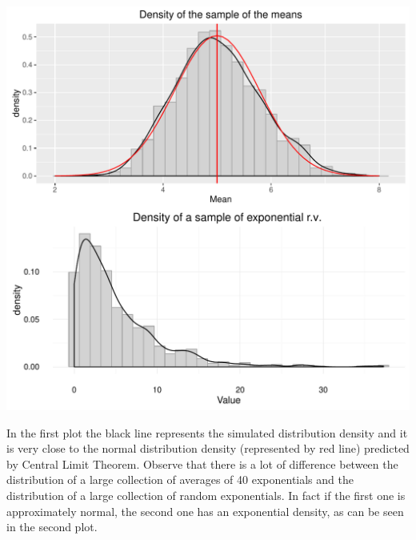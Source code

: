 \documentclass[10pt]{article}\usepackage[]{graphicx}\usepackage[]{color}
\newenvironment{knitrout}{}{} %
\begin{document}
\begin{knitrout}
{\centering \includegraphics[width=0.7\linewidth]{figure/minimal-distribution-1} 

}



\end{knitrout}

In the first plot the black line represents the simulated distribution density and it is very close to the  normal distribution density (represented by red line) predicted by  Central Limit Theorem. Observe that  there is a lot of difference between the distribution of a large collection of averages of 40 exponentials and the distribution of a large collection of random exponentials. In fact if the first one is approximately normal, the second one has an exponential density, as can be seen in the second plot.  
\end{document}
